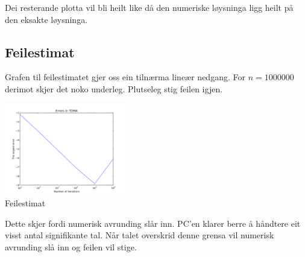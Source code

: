 \documentclass[11pt, a4paper]{article}
\begin{document}
    Dei resterande plotta vil bli heilt like då den numeriske løysninga ligg heilt på den 
    eksakte løysninga.

  \subsection{Feilestimat}
    Grafen til feilestimatet gjer oss ein tilnærma lineær nedgang. For $n = 1000000$ derimot skjer 
    det noko underleg. Plutseleg stig feilen igjen. 

    \begin{center}
      \includegraphics[width=200px]{ERROR.png} \\
      \caption{Feilestimat}
    \end{center}

    Dette skjer fordi numerisk avrunding slår inn. PC'en klarer berre å håndtere eit visst antal
    signifikante tal. Når talet overskrid denne grensa vil numerisk avrunding slå inn og feilen vil
    stige.
\end{document}
